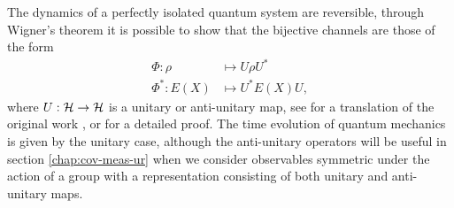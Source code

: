 The dynamics of a perfectly isolated quantum system are reversible, through Wigner's theorem it is possible to show that the bijective channels are those of the form
\begin{align}
  \Phi:\rho&\mapsto U\rho U^*\\
  \Phi^*:E(X)&\mapsto U^* E(X) U,
\end{align}
where $U:\mathcal{H}\to\mathcal{H}$ is a unitary or anti-unitary map, see \cite{wigner1960} for a translation of the original work \cite{wigner1931}, or \cite{bargmann1964-wigner} for a detailed proof. The time evolution of quantum mechanics is given by the unitary case, although the anti-unitary operators will be useful in section \ref{chap:cov-meas-ur} when we consider observables symmetric under the action of a group with a representation consisting of both unitary and anti-unitary maps.


